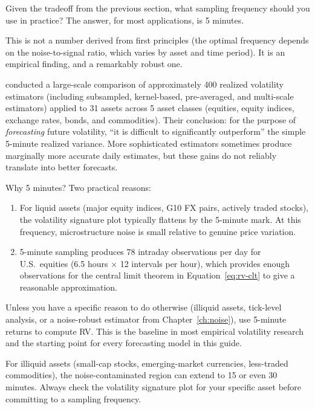 Given the tradeoff from the previous section, what sampling frequency should you use in practice?
The answer, for most applications, is 5 minutes.

This is not a number derived from first principles (the optimal frequency depends on the noise-to-signal ratio, which varies by asset and time period).
It is an empirical finding, and a remarkably robust one.

\begin{keyresult}
\citet{LPS2015} conducted a large-scale comparison of approximately 400 realized volatility estimators (including subsampled, kernel-based, pre-averaged, and multi-scale estimators) applied to 31 assets across 5 asset classes (equities, equity indices, exchange rates, bonds, and commodities).
Their conclusion: for the purpose of \emph{forecasting} future volatility, ``it is difficult to significantly outperform'' the simple 5-minute realized variance.
More sophisticated estimators sometimes produce marginally more accurate daily estimates, but these gains do not reliably translate into better forecasts.
\end{keyresult}

Why 5 minutes?
Two practical reasons:
\begin{enumerate}[nosep]
  \item For liquid assets (major equity indices, G10 FX pairs, actively traded stocks), the volatility signature plot typically flattens by the 5-minute mark. At this frequency, microstructure noise is small relative to genuine price variation.
  \item 5-minute sampling produces 78 intraday observations per day for U.S.\ equities (6.5 hours $\times$ 12 intervals per hour), which provides enough observations for the central limit theorem in Equation~\eqref{eq:rv-clt} to give a reasonable approximation.
\end{enumerate}

\begin{keyidea}
Unless you have a specific reason to do otherwise (illiquid assets, tick-level analysis, or a noise-robust estimator from Chapter~\ref{ch:noise}), use 5-minute returns to compute RV.
This is the baseline in most empirical volatility research and the starting point for every forecasting model in this guide.
\end{keyidea}

\begin{warning}
For illiquid assets (small-cap stocks, emerging-market currencies, less-traded commodities), the noise-contaminated region can extend to 15 or even 30 minutes.
Always check the volatility signature plot for your specific asset before committing to a sampling frequency.
\end{warning}

